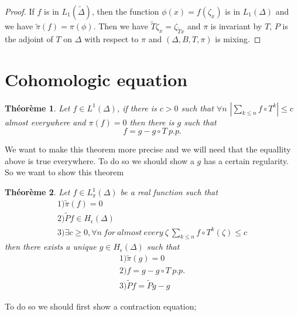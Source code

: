 \documentclass[12pt]{article}
\theoremstyle{plain}%
\newtheorem{thm}{Théorème}[section]
\theoremstyle{definition}
\theoremstyle{remark}
\begin{document}
\begin{proof}
If $f$ is in  $L_1(\tilde{\Delta})$, then the function $\phi(x)=f(\zeta_x)$ is in $L_1(\Delta)$ and we have $\tilde{\pi}(f) = \pi (\phi)$.
\newline
Then we have $\tilde{T} \zeta_x = \zeta_{\tilde{T}x}$ and $\pi$ is invariant by $T$, $P$ is the adjoint of $T$ on $\Delta$ with respect to $\pi$ and $(\Delta, B, T, \pi)$ is mixing.
\end{proof}

\section{Cohomologic equation}
\begin{thm}
Let $f \in L^1(\Delta)$, if there is $c>0$ such that $\forall n$ $|\sum_{k \leq n}f \circ T^k|\leq c$ almost everywhere and $\pi(f)=0$ then there is $g$ such that \[
f=g-g \circ T \ p.p.
\]
\end{thm}
We want to make this theorem more precise and we will need that the equallity above is true everywhere. To do so we should show a $g$ has a certain regularity. So we want to show this theorem
\begin{thm}
Let $f \in L^1_\pi(\Delta)$ be a real function such that \[
\begin{matrix}
1)\tilde{\pi}(f)=0 \\
2)\tilde{P}f \in H_\epsilon(\Delta)\\
3)\exists c \geq 0,\forall n \ for\ almost\ every\ \zeta \ \sum_{k \leq n}f \circ T^k(\zeta)\leq c
\end{matrix}
\]then there exists a unique $g \in H_\epsilon(\Delta)$ such that\[\begin{matrix}
1)\tilde{\pi}(g)=0 \\
2)f=g-g\circ T \ p.p. \\
3)\tilde{P}f=\tilde{P}g-g
\end{matrix}
\]
\end{thm}
To do so we should first show a contraction equation;
\end{document}
